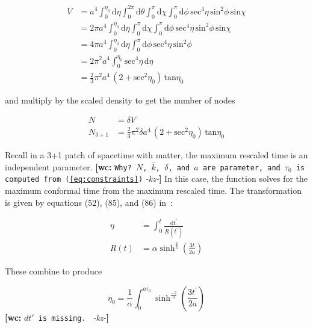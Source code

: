 \documentclass[preprint,notitlepage,amsmath,amssymb,floatfix]{revtex4-1}
\newcommand{\XXX}[3]{{\bf [#1: } {\tt #3} {\it -#2-}{\bf ]}}
\begin{document}
\begin{equation}
\begin{split}
V &= a^4 \int_0^{\eta_0} \! \mathrm{d}\eta \int_0^{2\pi} \! \mathrm{d}\theta \int_0^\pi \! \mathrm{d}\chi \int_0^\pi \! \mathrm{d}\phi \, \mathrm{sec}^4\eta \, \mathrm{sin}^2\phi \, \mathrm{sin}\chi \\
  &= 2\pi a^4 \int_0^{\eta_0} \! \mathrm{d}\eta \int_0^\pi \! \mathrm{d}\chi \int_0^\pi \! \mathrm{d}\phi \, \mathrm{sec}^4\eta \, \mathrm{sin}^2\phi \, \mathrm{sin}\chi \\
  &= 4\pi a^4 \int_0^{\eta_0} \! \mathrm{d}\eta \int_0^\pi \! \mathrm{d}\phi \, \mathrm{sec}^4\eta \, \mathrm{sin}^2\phi \\
  &= 2\pi^2 a^4 \int_0^{\eta_0} \! \mathrm{sec}^4\eta \, \mathrm{d}\eta \\
  &= \frac{2}{3}\pi^2 a^4 \, (2+\mathrm{sec}^2\eta_0) \, \mathrm{tan}\eta_0
\end{split}
\end{equation}

\noindent and multiply by the scaled density to get the number of nodes

\begin{equation}
\label{eq:finalN3}
\begin{split}
N &= \delta V \\
N_{\mathrm{3+1}} &= \frac{2}{3}\pi^2\delta a^4 \, (2+\mathrm{sec}^2\eta_0) \, \mathrm{tan}\eta_0
\end{split}
\end{equation}

\noindent Recall in a 3+1 patch of spacetime with matter, the maximum rescaled time is an independent parameter. \XXX{wc}{kz}{Why? $N$, $\bar{k}$, $\delta$, and $a$ are parameter, and $\tau_0$ is computed from (\ref{eq:constraints})}
In this case, the function solves for the maximum conformal time from the maximum rescaled time.
The transformation is given by equations (52), (85), and (86) in~\cite{ref:snc2012}:

\begin{equation}
\begin{split}
\eta &= \int_0^t\!\frac{\mathrm dt^\prime}{R\left(t^\prime\right)} \\
R\left(t\right) &= \alpha\sinh^{\frac{2}{3}}\left(\frac{3t}{2a}\right)
\end{split}
\end{equation}

\noindent These combine to produce

\begin{equation}
\eta_0 = \frac{1}{\alpha}\int_0^{a\tau_0}\!\sinh^{\frac{-2}{3}}\left(\frac{3t^\prime}{2a}\right)
\end{equation}
\XXX{wc}{kz}{$dt'$ is missing. }
\end{document}
